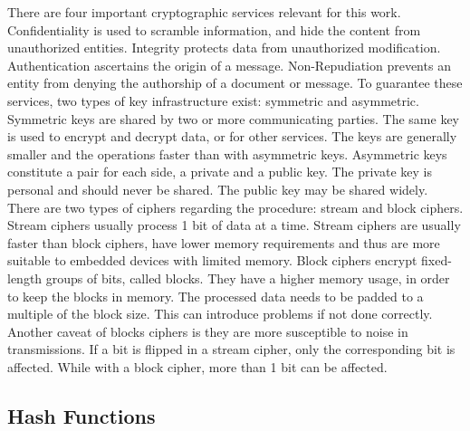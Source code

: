There are four important cryptographic services relevant for this work. Confidentiality is used to scramble information, and hide the content from unauthorized entities. Integrity protects data from unauthorized modification. Authentication ascertains the origin of a message. Non-Repudiation prevents an entity from denying the authorship of a document or message.
To guarantee these services, two types of key infrastructure exist: symmetric and asymmetric. Symmetric keys are shared by two or more communicating parties. The same key is used to encrypt and decrypt data, or for other services. The keys are generally smaller and the operations faster than with asymmetric keys. Asymmetric keys constitute a pair for each side, a private and a public key. The private key is personal and should never be shared. The public key may be shared widely.
There are two types of ciphers regarding the procedure: stream and block ciphers. Stream ciphers usually process 1 bit of data at a time. Stream ciphers are usually faster than block ciphers, have lower memory requirements and thus are more suitable to embedded devices with limited memory. Block ciphers encrypt fixed-length groups of bits, called blocks. They have a higher memory usage, in order to keep the blocks in memory. The processed data needs to be padded to a multiple of the block size. This can introduce problems if not done correctly. Another caveat of blocks ciphers is they are more susceptible to noise in transmissions. If a bit is flipped in a stream cipher, only the corresponding bit is affected. While with a block cipher, more than 1 bit can be affected.

\subsection{Hash Functions}\label{chap:background:crypto:hash}

